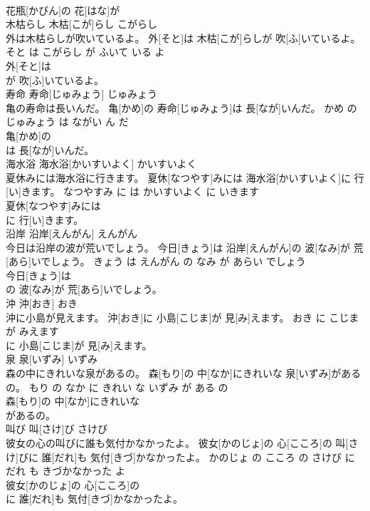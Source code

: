 \documentclass[8pt]{extreport}
\begin{document}
\begin{CJK}{UTF8}{min}
\\	花瓶[かびん]の 花[はな]が
\\	木枯らし	木枯[こが]らし	こがらし	
\\	外は木枯らしが吹いているよ。	外[そと]は 木枯[こが]らしが 吹[ふ]いているよ。	そと は こがらし が ふいて いる よ	
\\	外[そと]は
\\	が 吹[ふ]いているよ。			
\\	寿命	寿命[じゅみょう]	じゅみょう	
\\	亀の寿命は長いんだ。	亀[かめ]の 寿命[じゅみょう]は 長[なが]いんだ。	かめ の じゅみょう は ながい ん だ	
\\	亀[かめ]の
\\	は 長[なが]いんだ。			
\\	海水浴	海水浴[かいすいよく]	かいすいよく	
\\	夏休みには海水浴に行きます。	夏休[なつやす]みには 海水浴[かいすいよく]に 行[い]きます。	なつやすみ に は かいすいよく に いきます	
\\	夏休[なつやす]みには
\\	に 行[い]きます。			
\\	沿岸	沿岸[えんがん]	えんがん	
\\	今日は沿岸の波が荒いでしょう。	今日[きょう]は 沿岸[えんがん]の 波[なみ]が 荒[あら]いでしょう。	きょう は えんがん の なみ が あらい でしょう	
\\	今日[きょう]は
\\	の 波[なみ]が 荒[あら]いでしょう。			
\\	沖	沖[おき]	おき	
\\	沖に小島が見えます。	沖[おき]に 小島[こじま]が 見[み]えます。	おき に こじま が みえます	
\\	に 小島[こじま]が 見[み]えます。			
\\	泉	泉[いずみ]	いずみ	
\\	森の中にきれいな泉があるの。	森[もり]の 中[なか]にきれいな 泉[いずみ]があるの。	もり の なか に きれい な いずみ が ある の	
\\	森[もり]の 中[なか]にきれいな
\\	があるの。			
\\	叫び	叫[さけ]び	さけび	
\\	彼女の心の叫びに誰も気付かなかったよ。	彼女[かのじょ]の 心[こころ]の 叫[さけ]びに 誰[だれ]も 気付[きづ]かなかったよ。	かのじょ の こころ の さけび に だれ も きづかなかった よ	
\\	彼女[かのじょ]の 心[こころ]の
\\	に 誰[だれ]も 気付[きづ]かなかったよ。			

\end{CJK}
\end{document}
